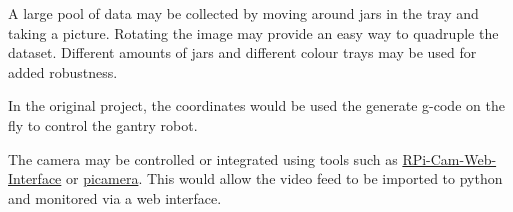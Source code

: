\documentclass[11pt]{article}
\begin{document}
            A large pool of data may be collected by moving around jars in the tray and taking a picture. Rotating the image may provide an easy way to quadruple the dataset. Different amounts of jars and different colour trays may be used for added robustness.

            In the original project, the coordinates would be used the generate g-code on the fly to control the gantry robot.

            The camera may be controlled or integrated using tools such as \href{https://github.com/silvanmelchior/RPi_Cam_Web_Interface}{RPi-Cam-Web-Interface} or \href{https://github.com/waveform80/picamera}{picamera}. This would allow the video feed to be imported to python and monitored via a web interface.
\end{document}
